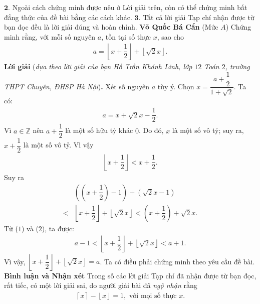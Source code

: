 \begin{multicols}{2}
	\vskip 0.05cm
	$\pmb{2.}$ Ngoài cách chứng minh được nêu ở Lời giải trên, còn có thể chứng minh bất đẳng thức của đề bài bằng các cách khác.
	\vskip 0.05cm
	$\pmb{3.}$ Tất cả lời giải Tạp chí nhận được từ bạn đọc đều là lời giải đúng và hoàn chỉnh.
	\vskip 0.15cm
	\hfill	\textbf{\color{thachthuctoanhoc}Võ Quốc Bá Cẩn}
	\vskip 0.15cm
	{}
	(Mức $A$) Chứng minh rằng, với mỗi số nguyên $a$, tồn tại số thực $x$, sao cho  
	\begin{align*}
		a=\left\lfloor x +\dfrac12\right\rfloor+\left\lfloor\sqrt{2}x\right\rfloor.
	\end{align*}
	\textbf{\color{thachthuctoanhoc}Lời giải} (\textit{dựa theo lời giải của bạn Hồ Trần Khánh Linh, lớp $12$ Toán $2$, trường THPT Chuyên, ĐHSP Hà Nội})\textbf{\color{thachthuctoanhoc}.}
	\vskip 0.05cm
	Xét số nguyên $a$ tùy ý. Chọn $x = \dfrac{{a + \dfrac{1}{2}}}{{1 + \sqrt 2 }}.$  Ta có:
	\begin{align*}
		a = x + \sqrt 2 x - \dfrac{1}{2}. \tag{$1$}
	\end{align*}
	Vì $a \in \mathbb{Z}$  nên $a + \dfrac{1}{2}$ là một số hữu tỷ khác $0$. Do đó, $x$ là một số vô tỷ; suy ra, $x + \dfrac{1}{2}$ là một số vô tỷ. Vì vậy
	\begin{align*}
		\left\lfloor {x + \dfrac{1}{2}} \right\rfloor < x + \dfrac{1}{2}.
	\end{align*}
	Suy ra
	\begin{align*}
		&\left( {\left( {x + \dfrac{1}{2}} \right) - 1} \right) + \left( {\sqrt 2 x - 1} \right) \\
		< &\left\lfloor\! {x \!+\! \dfrac{1}{2}} \!\right\rfloor \!+\! \left\lfloor\! {\sqrt 2 x} \!\right\rfloor \!\!<\!\! \left(\! {x \!+\! \dfrac{1}{2}}\! \right) \!+\! \sqrt 2 x. \tag{$2$}
	\end{align*}
	Từ ($1$) và ($2$), ta được:
	\begin{align*}
		a - 1 < \left\lfloor {x + \dfrac{1}{2}} \right\rfloor + \left\lfloor {\sqrt 2 x} \right\rfloor < a + 1.
	\end{align*}
	Vì vậy, $\left\lfloor {x + \dfrac{1}{2}} \right\rfloor + \left\lfloor {\sqrt 2 x} \right\rfloor = a$.
	\vskip 0.05cm   
	Ta có điều phải chứng minh theo yêu cầu đề bài.
	\vskip 0.05cm
	\textbf{\color{thachthuctoanhoc}Bình luận và Nhận xét}
	\vskip 0.05cm
	Trong số các lời giải Tạp chí đã nhận được từ bạn đọc, rất tiếc, có một lời giải sai, do người giải bài đã \textit{ngộ nhận} rằng
	\begin{align*}
		 \left\lceil x \right\rceil  - \left\lfloor x \right\rfloor = 1, \text{ với mọi số thực } x.

\end{align*}
\end{multicols}
